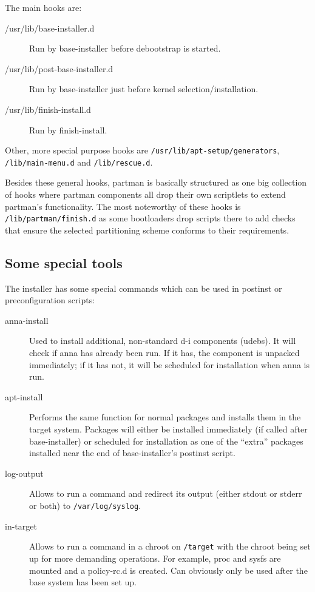 \documentclass[a4paper,10pt]{article}
\begin{document}
The main hooks are: 

\begin{description}
\item[/usr/lib/base-installer.d] Run by base-installer before debootstrap is started.
\item[/usr/lib/post-base-installer.d] Run by base-installer just before kernel selection/installation.
\item[/usr/lib/finish-install.d] Run by finish-install. 
\end{description}

Other, more special purpose hooks are \texttt{/usr/lib/apt-setup/generators}, \texttt{/lib/main-menu.d} and \texttt{/lib/rescue.d}. 

Besides these general hooks, partman is basically structured as one big collection of hooks where partman components all drop their own scriptlets to extend partman's functionality. The most noteworthy of these hooks is \texttt{/lib/partman/finish.d} as some bootloaders drop scripts there to add checks that ensure the selected partitioning scheme conforms to their requirements. 


\subsection{Some special tools}
The installer has some special commands which can be used in postinst or preconfiguration scripts: 

\begin{description}
\item[anna-install]
Used to install additional, non-standard d-i components (udebs). It will check if anna has already been run. If it has, the component is unpacked immediately; if it has not, it will be scheduled for installation when anna is run.
\item[apt-install]
Performs the same function for normal packages and installs them in the target system. Packages will either be installed immediately (if called after base-installer) or scheduled for installation as one of the “extra” packages installed near the end of base-installer's postinst script.
\item[log-output]
Allows to run a command and redirect its output (either stdout or stderr or both) to \texttt{/var/log/syslog}. 
\item[in-target]
Allows to run a command in a chroot on \texttt{/target} with the chroot being set up for more demanding operations. For example, proc and sysfs are mounted and a policy-rc.d is created. Can obviously only be used after the base system has been set up. 
\end{description}
\end{document}
